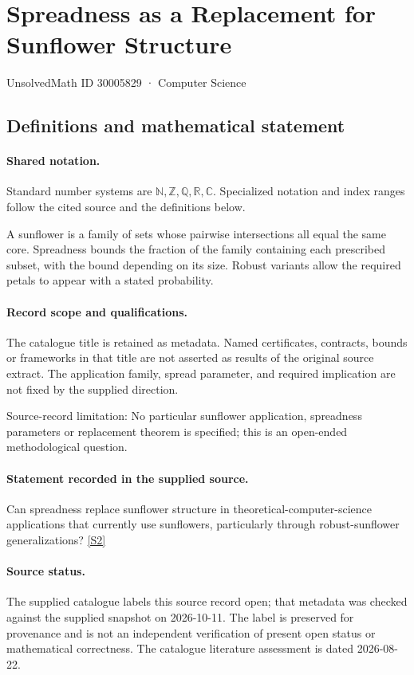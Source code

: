 \documentclass[11pt]{article}
\newcommand{\sref}[2]{\hyperlink{source:#1:#2}{[S#2]}}
\begin{document}
\setcounter{section}{30005828}
\section{Spreadness as a Replacement for Sunflower Structure}\label{30005829}
{\small\sffamily UnsolvedMath ID 30005829 · Computer Science}
\subsection{Definitions and mathematical statement}

\paragraph{Shared notation.}Standard number systems are $\mathbb N,\mathbb Z,\mathbb Q,\mathbb R,\mathbb C$. Specialized notation and index ranges follow the cited source and the definitions below.


A sunflower is a family of sets whose pairwise intersections all equal the same core. Spreadness bounds the fraction of the family containing each prescribed subset, with the bound depending on its size. Robust variants allow the required petals to appear with a stated probability.
\paragraph{Record scope and qualifications.}
The catalogue title is retained as metadata. Named certificates, contracts, bounds or frameworks in that title are not asserted as results of the original source extract.
The application family, spread parameter, and required implication are not fixed by the supplied direction.

Source-record limitation: No particular sunflower application, spreadness parameters or replacement theorem is specified; this is an open-ended methodological question.
\paragraph{Statement recorded in the supplied source.}
Can spreadness replace sunflower structure in theoretical-computer-science applications that currently use sunflowers, particularly through robust-sunflower generalizations? \sref{30005829}{2}
\paragraph{Source status.}
The supplied catalogue labels this source record open; that metadata was checked against the supplied snapshot on 2026-10-11. The label is preserved for provenance and is not an independent verification of present open status or mathematical correctness. The catalogue literature assessment is dated 2026-08-22.
\end{document}
